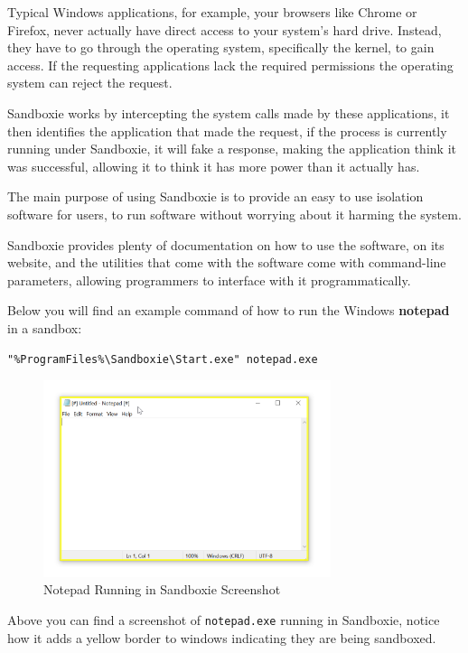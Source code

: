 Typical Windows applications, for example, your browsers like Chrome or Firefox,
never actually have direct access to your system's hard drive.
Instead, they have to go through the operating system, specifically the kernel,
to gain access. If the requesting applications lack the required permissions
the operating system can reject the request.

Sandboxie works by intercepting the system calls made by these applications,
it then identifies the application that made the request,
if the process is currently running under Sandboxie,
it will fake a response, making the application think it was successful,
allowing it to think it has more power than it actually has.

The main purpose of using Sandboxie is to provide an
easy to use isolation software for users, to run software
without worrying about it harming the system.

Sandboxie provides plenty of documentation on how to use the software, on its website,
and the utilities that come with the software come with command-line parameters,
allowing programmers to interface with it programmatically.

Below you will find an example command of how to run the Windows
\textbf{notepad} in a sandbox:

\begin{lstlisting}
"%ProgramFiles%\Sandboxie\Start.exe" notepad.exe
\end{lstlisting}

\begin{figure}[h!]
    \centering
    \label{image:sandboxieScreenshot}
    \includegraphics[width=0.75\textwidth]{images/screenshots/sandboxie}
    \caption{Notepad Running in Sandboxie Screenshot}
\end{figure}

Above you can find a screenshot
of \texttt{notepad.exe} running in Sandboxie,
notice how it adds a yellow border to windows
indicating they are being sandboxed.

